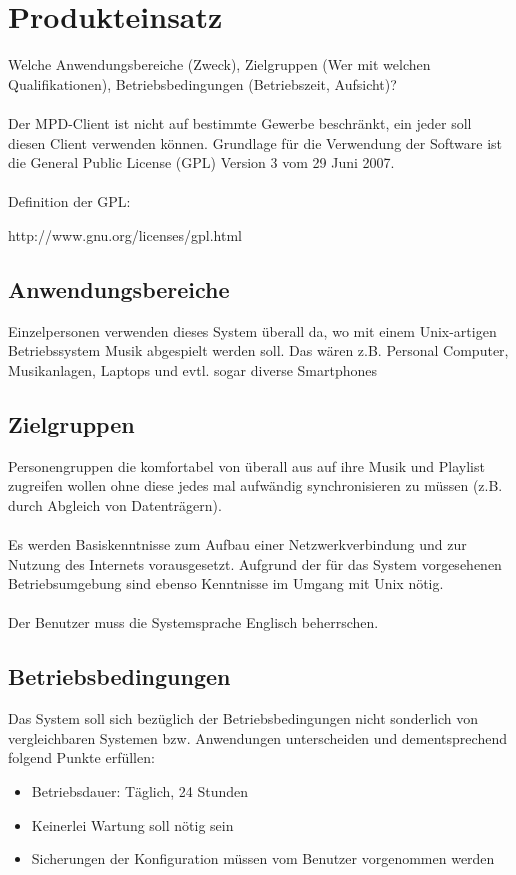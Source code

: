 \section{Produkteinsatz}
Welche Anwendungsbereiche (Zweck), Zielgruppen (Wer mit welchen Qualifikationen), Betriebsbedingungen (Betriebszeit,
Aufsicht)?\ \\ \\
Der MPD-Client ist nicht auf bestimmte Gewerbe beschränkt, ein jeder soll diesen Client
verwenden können. Grundlage für die Verwendung der Software ist die General Public License (GPL)
Version 3 vom 29 Juni 2007.\ \\ \\
Definition der GPL:
\begin{center}
http://www.gnu.org/licenses/gpl.html
\end{center}
\subsection{Anwendungsbereiche}
Einzelpersonen verwenden dieses System überall da, wo mit 
einem Unix-artigen Betriebssystem Musik abgespielt werden soll.
Das wären z.B. Personal Computer, Musikanlagen, Laptops und evtl.
sogar diverse Smartphones
\subsection{Zielgruppen}
Personengruppen die komfortabel von überall aus auf ihre Musik und Playlist zugreifen
wollen ohne diese jedes mal aufwändig synchronisieren zu müssen (z.B. durch Abgleich von Datenträgern).\ \\ \\
Es werden Basiskenntnisse zum Aufbau einer Netzwerkverbindung und zur Nutzung des Internets vorausgesetzt.
Aufgrund der für das System vorgesehenen Betriebsumgebung sind ebenso Kenntnisse im Umgang mit Unix nötig.\ \\ \\
Der Benutzer muss die Systemsprache Englisch beherrschen.
\subsection{Betriebsbedingungen}
Das System soll sich bezüglich der Betriebsbedingungen nicht sonderlich von vergleichbaren Systemen bzw.
Anwendungen unterscheiden und dementsprechend folgend Punkte erfüllen:
\begin{itemize}
	\item Betriebsdauer: Täglich, 24 Stunden
	\item Keinerlei Wartung soll nötig sein
	\item Sicherungen der Konfiguration müssen vom Benutzer vorgenommen werden
\end{itemize}
